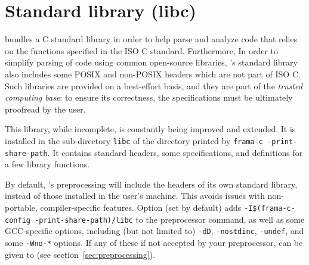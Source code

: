 
\section{Standard library (libc)}\label{sec:libc}

\FramaC bundles a C standard library in order to help parse and analyze code
that relies on the functions specified in the ISO C standard.
Furthermore, In order to simplify parsing of code using common open-source libraries,
\FramaC's standard library also includes some POSIX and non-POSIX headers which
are not part of ISO C.
Such libraries are provided on a best-effort basis, and they are part of the
{\em trusted computing base}: to ensure its correctness, the specifications
must be ultimately proofread by the user.

This library, while incomplete, is constantly being improved and extended.
It is installed in the sub-directory \texttt{libc} of the directory printed by
\texttt{frama-c -print-share-path}. It contains standard \C headers,
some \acsl specifications, and definitions for a few library functions.

By default, \FramaC's preprocessing will include the headers of its own standard
library, instead of those installed in the user's machine. This avoids issues
with non-portable, compiler-specific features.
Option  (set by default)
adds \verb+-I$(frama-c-config -print-share-path)/libc+ to the preprocessor
command, as well as some GCC-specific options, including (but not limited to)
\texttt{-dD}, \texttt{-nostdinc}, \texttt{-undef}, and some \texttt{-Wno-*}
options. If any of these if not accepted by your preprocessor,
 can be given to \FramaC
(see section~\ref{sec:preprocessing}).

